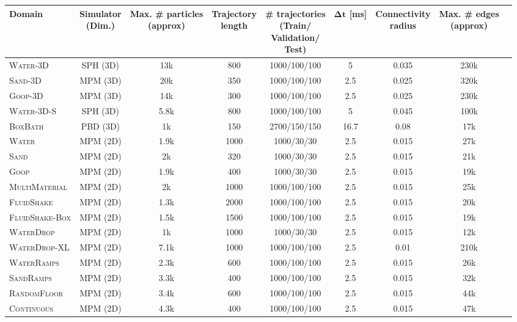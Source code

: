 \documentclass{article}
\newcommand{\multiline}[3][11mm]{\begin{minipage}[c][#1]{#2}#3\end{minipage}}
\newcommand\domain[1]{\textsc{#1}}
\begin{document}
\begin{center}
\begin{tabular}[p]{|l||c|c|c|c|c|c|c|c|}
	\hline
	\textbf{Domain} &  
	\multiline{15mm}{\centering\textbf{Simulator \\ (Dim.)}} & 
	\multiline{13mm}{\centering\textbf{Max. \# particles \\ (approx)}} &
	\multiline{16mm}{\centering\textbf{Trajectory \\ length}} &
	\multiline[20mm]{25mm}{\centering\textbf{\# trajectories \\ (Train/\\Validation/\\Test)}}  &
	\multiline{7mm}{\centering$\mathbf{\Delta t}$ \textbf{[ms]}} &
	\multiline{19mm}{\centering\textbf{Connectivity \\ radius}} & 
	\multiline{12mm}{\centering\textbf{Max. \# edges\\(approx)}} \\\hline\hline
    \domain{Water-3D} & SPH (3D) & 13k & 800 & 1000/100/100 & 5 & 0.035 & 230k \\\hline
    \domain{Sand-3D} & MPM (3D) & 20k & 350 & 1000/100/100 & 2.5 & 0.025 & 320k \\\hline
    \domain{Goop-3D} & MPM (3D) & 14k & 300 & 1000/100/100 & 2.5 & 0.025 & 230k \\\hline
    \domain{Water-3D-S} & SPH (3D) & 5.8k & 800 & 1000/100/100 & 5 & 0.045 & 100k \\\hline
    \domain{BoxBath} & PBD (3D) & 1k & 150 & 2700/150/150 & 16.7 & 0.08 & 17k \\\hline
    \domain{Water} & MPM (2D) & 1.9k & 1000 & 1000/30/30 & 2.5 & 0.015 & 27k \\\hline
    \domain{Sand} & MPM (2D) & 2k & 320 & 1000/30/30 & 2.5 & 0.015 & 21k \\\hline
    \domain{Goop} & MPM (2D) & 1.9k & 400 & 1000/30/30 & 2.5 & 0.015 & 19k \\\hline
    \domain{MultiMaterial} & MPM (2D) & 2k & 1000 & 1000/100/100 & 2.5 & 0.015 & 25k \\\hline
    \domain{FluidShake} & MPM (2D) & 1.3k & 2000 & 1000/100/100 & 2.5 & 0.015 & 20k \\\hline
    \domain{FluidShake-Box} & MPM (2D) & 1.5k & 1500 & 1000/100/100 & 2.5 & 0.015 & 19k \\\hline
    \domain{WaterDrop} & MPM (2D) & 1k & 1000 & 1000/30/30 & 2.5 & 0.015 & 12k \\\hline
    \domain{WaterDrop-XL} & MPM (2D) & 7.1k & 1000 & 1000/100/100 & 2.5 & 0.01 & 210k \\\hline
    \domain{WaterRamps} & MPM (2D) & 2.3k & 600 & 1000/100/100 & 2.5 & 0.015 & 26k \\\hline
    \domain{SandRamps} & MPM (2D) & 3.3k & 400 & 1000/100/100 & 2.5 & 0.015 & 32k \\\hline
    \domain{RandomFloor} & MPM (2D) & 3.4k & 600 & 1000/100/100 & 2.5 & 0.015 & 44k \\\hline
    \domain{Continuous} & MPM (2D) & 4.3k & 400 & 1000/100/100 & 2.5 & 0.015 & 47k \\\hline
\end{tabular}
\end{center}
\end{document}
